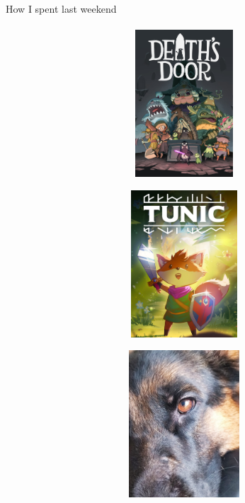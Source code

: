\documentclass[aspectratio=169]{beamer}
\begin{document}
\begin{frame}[c]{How I spent last weekend}
    \framesubtitle{}
    \begin{figure}[H]
        \begin{subfigure}{0.29\textwidth}
            \centering\includegraphics[height=5.5cm,width=1\textwidth,keepaspectratio]{death_door.jpg}
        \end{subfigure}
        \hfill
        \begin{subfigure}{0.29\textwidth}
            \centering\includegraphics[height=5.5cm,width=1\textwidth,keepaspectratio]{tunic_game.jpeg}
        \end{subfigure}
        \hfill
        \begin{subfigure}{0.29\textwidth}
            \centering\includegraphics[height=5.5cm,width=1\textwidth,keepaspectratio]{yarik.jpg}
        \end{subfigure}        
    \end{figure}
\end{frame}
\end{document}
